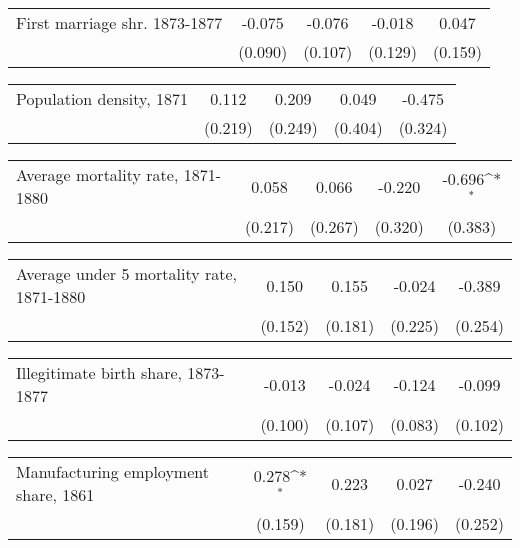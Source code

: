 {
\def\sym#1{\ifmmode^{#1}\else\(^{#1}\)\fi}
\begin{tabular}{l*{4}{c}}
\hline\hline
\hline
First marriage shr. 1873-1877&      -0.075         &      -0.076         &      -0.018         &       0.047         \\
                    &     (0.090)         &     (0.107)         &     (0.129)         &     (0.159)         \\
\hline\hline
\end{tabular}
}
{
\def\sym#1{\ifmmode^{#1}\else\(^{#1}\)\fi}
\begin{tabular}{l*{4}{c}}
\hline\hline
\hline
Population density, 1871&       0.112         &       0.209         &       0.049         &      -0.475         \\
                    &     (0.219)         &     (0.249)         &     (0.404)         &     (0.324)         \\
\hline\hline
\end{tabular}
}
{
\def\sym#1{\ifmmode^{#1}\else\(^{#1}\)\fi}
\begin{tabular}{l*{4}{c}}
\hline\hline
\hline
Average mortality rate, 1871-1880&       0.058         &       0.066         &      -0.220         &      -0.696\sym{*}  \\
                    &     (0.217)         &     (0.267)         &     (0.320)         &     (0.383)         \\
\hline\hline
\end{tabular}
}
{
\def\sym#1{\ifmmode^{#1}\else\(^{#1}\)\fi}
\begin{tabular}{l*{4}{c}}
\hline\hline
\hline
Average under 5 mortality rate, 1871-1880&       0.150         &       0.155         &      -0.024         &      -0.389         \\
                    &     (0.152)         &     (0.181)         &     (0.225)         &     (0.254)         \\
\hline\hline
\end{tabular}
}
{
\def\sym#1{\ifmmode^{#1}\else\(^{#1}\)\fi}
\begin{tabular}{l*{4}{c}}
\hline\hline
\hline
Illegitimate birth share, 1873-1877&      -0.013         &      -0.024         &      -0.124         &      -0.099         \\
                    &     (0.100)         &     (0.107)         &     (0.083)         &     (0.102)         \\
\hline\hline
\end{tabular}
}
{
\def\sym#1{\ifmmode^{#1}\else\(^{#1}\)\fi}
\begin{tabular}{l*{4}{c}}
\hline\hline
\hline
Manufacturing employment share, 1861&       0.278\sym{*}  &       0.223         &       0.027         &      -0.240         \\
                    &     (0.159)         &     (0.181)         &     (0.196)         &     (0.252)         \\
\hline\hline
\end{tabular}
}
